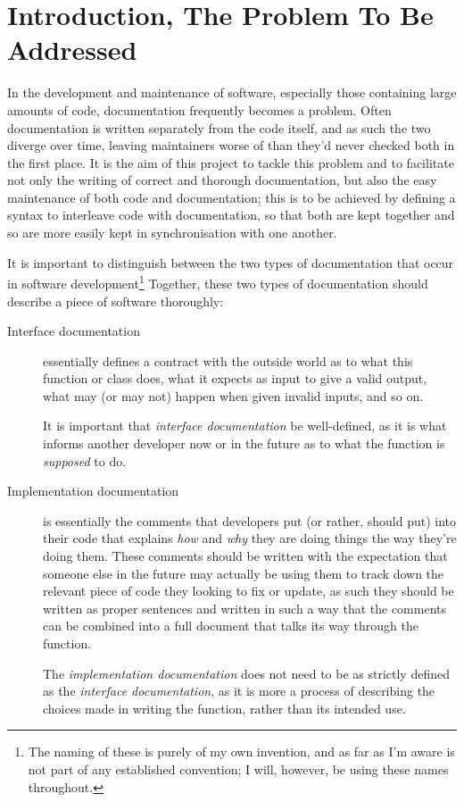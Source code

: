 \section{Introduction, The Problem To Be Addressed}

In the development and maintenance of software, especially those
containing large amounts of code, documentation frequently becomes a
problem. Often documentation is written separately from the code
itself, and as such the two diverge over time, leaving maintainers
worse of than they'd never checked both in the first place. It is the
aim of this project to tackle this problem and to facilitate not only
the writing of correct and thorough documentation, but also the easy
maintenance of both code and documentation; this is to be achieved by
defining a syntax to interleave code with documentation, so that both
are kept together and so are more easily kept in synchronisation with
one another.

It is important to distinguish between the two types of documentation
that occur in software development\footnote{The naming of these is
purely of my own invention, and as far as I'm aware is not part of any
established convention; I will, however, be using these names
throughout.} Together, these two types of documentation should
describe a piece of software thoroughly:

\begin{description}
\item[Interface documentation] essentially defines a contract with the
  outside world as to what this function or class does, what it
  expects as input to give a valid output, what may (or may not)
  happen when given invalid inputs, and so on.

  It is important that \emph{interface documentation} be well-defined,
  as it is what informs another developer now or in the future as to
  what the function is \emph{supposed} to do.

\item[Implementation documentation] is essentially the comments that
  developers put (or rather, should put) into their code that explains
  \emph{how} and \emph{why} they are doing things the way they're
  doing them. These comments should be written with the expectation
  that someone else in the future may actually be using them to track
  down the relevant piece of code they looking to fix or update, as
  such they should be written as proper sentences and written in such
  a way that the comments can be combined into a full document that
  talks its way through the function.

  The \emph{implementation documentation} does not need to be as
  strictly defined as the \emph{interface documentation}, as it is
  more a process of describing the choices made in writing the
  function, rather than its intended use.
\end{description}

